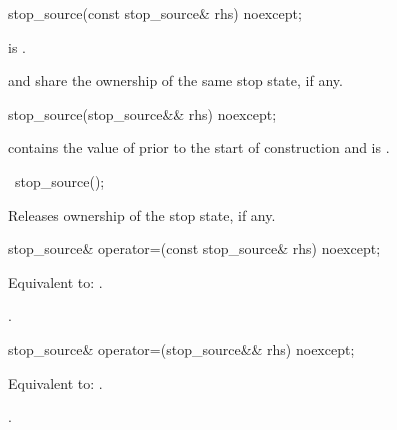 %
\begin{itemdecl}
stop_source(const stop_source& rhs) noexcept;
\end{itemdecl}

\begin{itemdescr}
\pnum
\ensures
{} is .
\begin{note}
 and  share the ownership of the same stop state,
if any.
\end{note}
\end{itemdescr}

%
\begin{itemdecl}
stop_source(stop_source&& rhs) noexcept;
\end{itemdecl}

\begin{itemdescr}
\pnum
\ensures
{} contains the value of 
prior to the start of construction
and  is .
\end{itemdescr}

%
\begin{itemdecl}
~stop_source();
\end{itemdecl}

\begin{itemdescr}
\pnum
\effects
Releases ownership of the stop state, if any.
\end{itemdescr}

%
\begin{itemdecl}
stop_source& operator=(const stop_source& rhs) noexcept;
\end{itemdecl}

\begin{itemdescr}
\pnum
\effects
Equivalent to: .

\pnum
\returns
{}.
\end{itemdescr}

%
\begin{itemdecl}
stop_source& operator=(stop_source&& rhs) noexcept;
\end{itemdecl}

\begin{itemdescr}
\pnum
\effects
Equivalent to: .

\pnum
\returns
{}.
\end{itemdescr}

